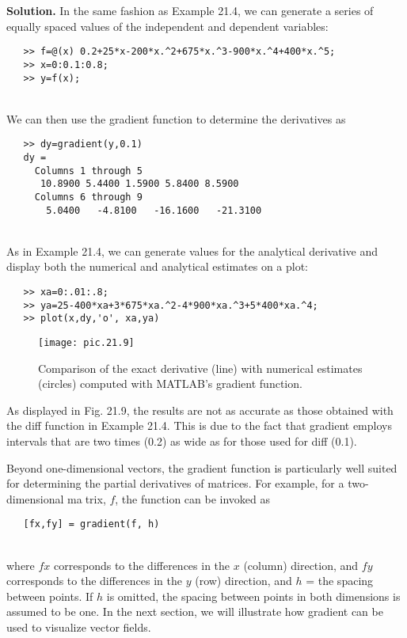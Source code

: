 \textbf{Solution.} In the same fashion as Example 21.4, we can generate a series of equally
spaced values of the independent and dependent variables:

\begin{verbatim}
   >> f=@(x) 0.2+25*x-200*x.^2+675*x.^3-900*x.^4+400*x.^5;
   >> x=0:0.1:0.8;
   >> y=f(x);
\end{verbatim}\\
We can then use the gradient function to determine the derivatives as
\begin{verbatim}
   >> dy=gradient(y,0.1)
   dy =
     Columns 1 through 5
      10.8900 5.4400 1.5900 5.8400 8.5900
     Columns 6 through 9
       5.0400   -4.8100   -16.1600   -21.3100
\end{verbatim}\\
As in Example 21.4, we can generate values for the analytical derivative and display both
the numerical and analytical estimates on a plot:
\begin{verbatim}
   >> xa=0:.01:.8;
   >> ya=25-400*xa+3*675*xa.^2-4*900*xa.^3+5*400*xa.^4;
   >> plot(x,dy,'o', xa,ya)
\end{verbatim}
\pagebreak
\begin{figure}[hbt!]
	\centering
	\texttt{[image: pic.21.9]}
	\caption{\textsf{Comparison of the exact derivative (line) with numerical estimates (circles) computed with
MATLAB’s gradient function.}} \vspace{0.1in} \hline 
	\label{pic.21.9}
\end{figure}
\vspace{0.2in}

As displayed in Fig. 21.9, the results are not as accurate as those obtained with the
diff function in Example 21.4. This is due to the fact that gradient employs intervals
that are two times (0.2) as wide as for those used for diff (0.1).

\vspace{0.4in}
Beyond one-dimensional vectors, the gradient function is particularly well suited
for determining the partial derivatives of matrices. For example, for a two-dimensional matrix, $f$, the function can be invoked as
\begin{verbatim}
   [fx,fy] = gradient(f, h)
\end{verbatim}\\
where $fx$ corresponds to the differences in the $x$ (column) direction, and $fy$ corresponds
to the differences in the $y$ (row) direction, and $h$ = the spacing between points. If $h$ is
omitted, the spacing between points in both dimensions is assumed to be one. In the next
section, we will illustrate how gradient can be used to visualize vector fields.

